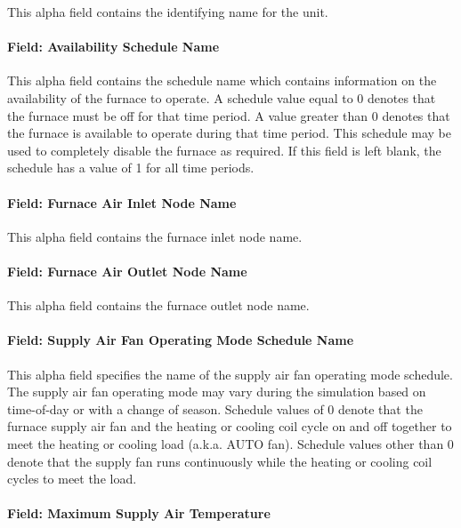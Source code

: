This alpha field contains the identifying name for the unit.

\paragraph{Field: Availability Schedule Name}\label{field-availability-schedule-name-1-012}

This alpha field contains the schedule name which contains information on the availability of the furnace to operate. A schedule value equal to 0 denotes that the furnace must be off for that time period. A value greater than 0 denotes that the furnace is available to operate during that time period. This schedule may be used to completely disable the furnace as required. If this field is left blank, the schedule has a value of 1 for all time periods.

\paragraph{Field: Furnace Air Inlet Node Name}\label{field-furnace-air-inlet-node-name}

This alpha field contains the furnace inlet node name.

\paragraph{Field: Furnace Air Outlet Node Name}\label{field-furnace-air-outlet-node-name}

This alpha field contains the furnace outlet node name.

\paragraph{Field: Supply Air Fan Operating Mode Schedule Name}\label{field-supply-air-fan-operating-mode-schedule-name}

This alpha field specifies the name of the supply air fan operating mode schedule. The supply air fan operating mode may vary during the simulation based on time-of-day or with a change of season. Schedule values of 0 denote that the furnace supply air fan and the heating or cooling coil cycle on and off together to meet the heating or cooling load (a.k.a. AUTO fan). Schedule values other than 0 denote that the supply fan runs continuously while the heating or cooling coil cycles to meet the load.

\paragraph{Field: Maximum Supply Air Temperature}\label{field-maximum-supply-air-temperature-1-000}

